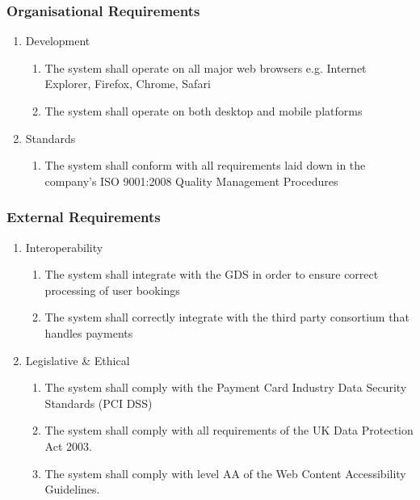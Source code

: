 \subsubsection{Organisational Requirements}
\begin{enumerate}
	\item Development

		\begin{enumerate}
			\item The system shall operate on all major web browsers e.g. Internet Explorer,
				Firefox, Chrome, Safari
			\item The system shall operate on both desktop and mobile platforms
		\end{enumerate}
	\item Standards

		\begin{enumerate}
			\item The system shall conform with all requirements laid down in the company's
				ISO 9001:2008 Quality Management Procedures
		\end{enumerate}
\end{enumerate}

\subsubsection{External Requirements}
\begin{enumerate}
	\item Interoperability

		\begin{enumerate}
			\item The system shall integrate with the GDS in order to ensure correct
				processing of user bookings
			\item The system shall correctly integrate with the third party consortium
				that handles payments
		\end{enumerate}
	\item Legislative \& Ethical

		\begin{enumerate}
			\item The system shall comply with the Payment Card Industry Data Security
				Standards (PCI DSS)
			\item The system shall comply with all requirements of the UK Data Protection
				Act 2003.
			\item The system shall comply with level AA of the Web Content Accessibility
				Guidelines.
		\end{enumerate}
\end{enumerate}
